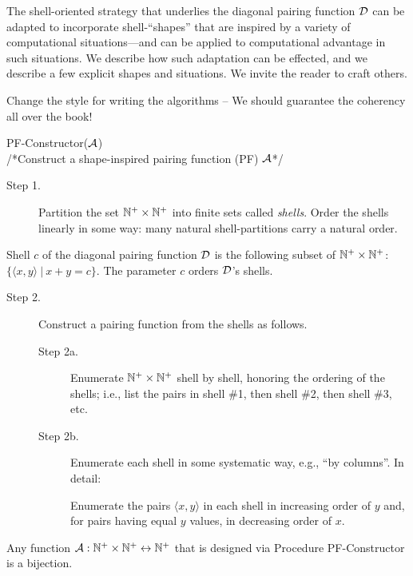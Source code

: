 The shell-oriented strategy that underlies the diagonal pairing function $\mbox{$\cal D$}$ can be adapted to incorporate shell-``shapes'' that are inspired by a variety of computational situations---and can be applied to computational advantage in such situations.  We describe how such adaptation can be effected, and we describe a few explicit shapes and situations.  We invite the reader to craft others.

\medskip

{\Denis Change the style for writing the algorithms -- We should guarantee the coherency all over the book!}

 {\small\sf PF-Constructor}($\mbox{$\cal A$}$) \\
/*Construct a shape-inspired pairing function (PF) $\mbox{$\cal A$}$*/
\begin{description}
\item[Step 1.]
%
Partition the set $\mathbb{N}^+ \times \mathbb{N}^+$ into finite sets called {\it shells}.  Order the shells linearly in some way: many natural shell-partitions carry a natural order.
\end{description}
Shell $c$ of the diagonal pairing function $\mbox{$\cal D$}$ is the following subset of $\mathbb{N}^+ \times \mathbb{N}^+$: $\{ \langle x,y \rangle \ | \ x+y = c \}$.  The parameter $c$ orders $\mbox{$\cal D$}$'s shells.

\begin{description}
\item[Step 2.]
Construct a pairing function from the shells as follows.
  \begin{description}
  \item[Step 2a.]
Enumerate $\mathbb{N}^+ \times \mathbb{N}^+$ shell by shell, honoring the ordering of the shells; i.e., list the pairs in shell \#1, then shell \#2, then shell \#3, etc.
  \item[Step 2b.]
Enumerate each shell in some systematic way, e.g., ``by columns''.  In detail:

\smallskip

Enumerate the pairs $\langle x,y \rangle$ in each shell in increasing order of $y$ and, for pairs having equal $y$ values, in decreasing order of $x$.
  \end{description}
\end{description}

\begin{prop}
\label{thm:PF-construct}
Any function $\mbox{$\cal A$}: \mathbb{N}^+ \times \mathbb{N}^+ \leftrightarrow \mathbb{N}^+$ that is designed via Procedure {\small\sf PF-Constructor} is a bijection.
\end{prop}

